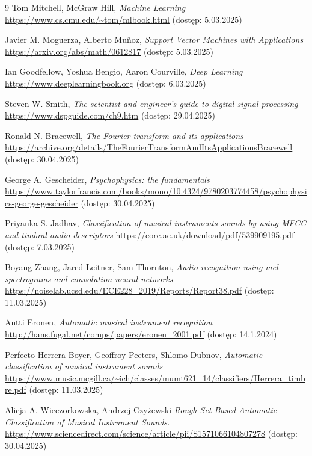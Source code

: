 \documentclass{SGGW-thesis}
\begin{document}
\begin{thebibliography}{9}
Tom Mitchell, McGraw Hill, \textit{Machine Learning} \url{https://www.cs.cmu.edu/~tom/mlbook.html} (dostęp: 5.03.2025)

Javier M. Moguerza, Alberto Muñoz, \textit{Support Vector Machines with Applications} \url{https://arxiv.org/abs/math/0612817} (dostęp: 5.03.2025)

Ian Goodfellow, Yoshua Bengio, Aaron Courville, \textit{Deep Learning} \url{https://www.deeplearningbook.org} (dostęp: 6.03.2025)

Steven W. Smith, \textit{The scientist and engineer's guide to digital signal processing} \url{https://www.dspguide.com/ch9.htm} (dostęp: 29.04.2025)

Ronald N. Bracewell, \textit{The Fourier transform and its applications} \url{https://archive.org/details/TheFourierTransformAndItsApplicationsBracewell} (dostęp: 30.04.2025)

George A. Gescheider, \textit{Psychophysics: the fundamentals} \url{https://www.taylorfrancis.com/books/mono/10.4324/9780203774458/psychophysics-george-gescheider} (dostęp: 30.04.2025)

Priyanka S. Jadhav, \textit{Classification of musical instruments sounds by using MFCC and timbral audio descriptors} \url{https://core.ac.uk/download/pdf/539909195.pdf} (dostęp: 7.03.2025)

Boyang Zhang, Jared Leitner, Sam Thornton, \textit{Audio recognition using mel spectrograms and convolution neural networks} \url{https://noiselab.ucsd.edu/ECE228_2019/Reports/Report38.pdf} (dostęp: 11.03.2025)

Antti Eronen, \textit{Automatic musical instrument recognition} \url{http://hans.fugal.net/comps/papers/eronen_2001.pdf} (dostęp: 14.1.2024)

Perfecto Herrera-Boyer, Geoffroy Peeters, Shlomo Dubnov, \textit{Automatic classification of musical instrument sounds} \url{https://www.music.mcgill.ca/~ich/classes/mumt621_14/classifiers/Herrera_timbre.pdf} (dostęp: 11.03.2025)

Alicja A. Wieczorkowska, Andrzej Czyżewski \textit{Rough Set Based Automatic Classification of Musical Instrument Sounds.} \url{https://www.sciencedirect.com/science/article/pii/S1571066104807278} (dostęp: 30.04.2025)


\end{thebibliography}
\end{document}
